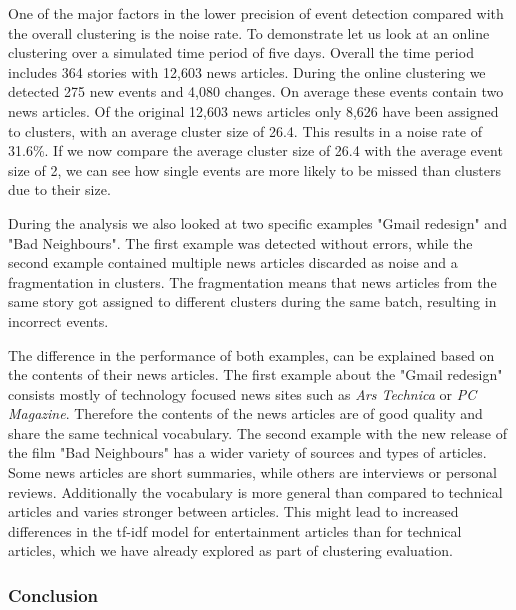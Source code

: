 One of the major factors in the lower precision of event detection
compared with the overall clustering is the noise rate.
To demonstrate let us look at an online clustering over a simulated time period of five days.
Overall the time period includes 364 stories with 12,603 news articles.
During the online clustering we detected 275 new events and 4,080 changes.
On average these events contain two news articles.
Of the original 12,603 news articles only 8,626 have been assigned to clusters,
with an average cluster size of 26.4.
This results in a noise rate of 31.6\%.
If we now compare the average cluster size of 26.4 with the average event size of 2,
we can see how single events are more likely to be missed than clusters due to their size.

During the analysis we also looked at two specific examples "Gmail redesign" and "Bad Neighbours".
The first example was detected without errors,
while the second example contained multiple news articles discarded as noise and a fragmentation in clusters.
The fragmentation means that news articles from the same story got assigned to different clusters during the same batch,
resulting in incorrect events.

The difference in the performance of both examples, can be explained based on the contents of their news articles.
The first example about the "Gmail redesign" consists mostly of technology focused news sites
such as \textit{Ars Technica} or \textit{PC Magazine}.
Therefore the contents of the news articles are of good quality and share the same technical vocabulary.
The second example with the new release of the film "Bad Neighbours"
has a wider variety of sources and types of articles.
Some news articles are short summaries, while others are interviews or personal reviews.
Additionally the vocabulary is more general than compared to technical articles and varies stronger between articles.
This might lead to increased differences in the tf-idf model for entertainment articles than for technical articles,
which we have already explored as part of clustering evaluation.

\subsubsection{Conclusion}

